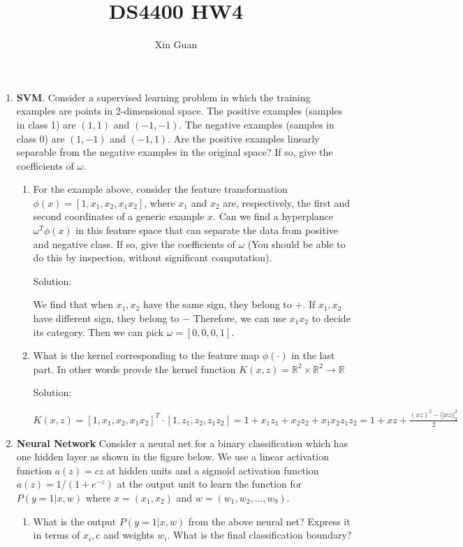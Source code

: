 \documentclass[12pt]{article}
\title{DS4400 HW4}
\author{Xin Guan}
\date{}
\newcommand{\solu}{{\color{blue} Solution:}}
\begin{document}
    \maketitle
    \begin{enumerate}
        \item \textbf{SVM}. Consider a supervised learning problem in which the training examples are points in 2-dimensional space. The positive examples (samples in class 1) are $(1, 1)$ and $(-1, -1)$. The negative examples (samples in class 0) are $(1, -1)$ and $(-1, 1)$. Are the positive examples linearly separable from the negative examples in the original space? If so, give the coefficients of $\omega$.
        \begin{enumerate}
            \item For the example above, consider the feature transformation $\phi(x) = [1, x_1, x_2, x_1x_2]$, where $x_1$ and $x_2$ are, respectively, the first and second coordinates of a generic example $x$. Can we find a hyperplance $\omega^T\phi(x)$ in this feature space that can separate the data from positive and negative class. If so, give the coefficients of $\omega$ (You should be able to do this by inspection, without significant computation).
            
            \solu 

            We find that when $x_1, x_2$ have the same sign, they belong to +. If $x_1, x_2$ have different sign, they belong to $-$ Therefore, we can use $x_1x_2$ to decide its category. Then we can pick $\omega = [0,0,0,1]$.

            \item What is the kernel corresponding to the feature map $\phi(\cdot)$ in the last part. In other words provde the kernel function $K(x,z) = \mathbb{R}^2 \times \mathbb{R}^2 \rightarrow \mathbb{R}$
            
            \solu 

            $K(x,z) = [1,x_1, x_2, x_1x_2]^T\cdot[1,z_1,z_2,z_1z_2] = 1 +x_1z_1 + x_2z_2 + x_1x_2z_1z_2 = 1 + xz + \frac{(xz)^2 - ||xz||_2^2}{2}$
            
        \end{enumerate}

        \item \textbf{Neural Network} Consider a neural net for a binary classification which has one hidden layer as shown in the figure below. We use a linear activation function $a(z) = cz$ at hidden units and a sigmoid activation function $a(z) = 1/(1 + e^{-z})$ at the output unit to learn the function for $P(y = 1|x, w)$ where $x = (x_1, x_2)$ and $w = (w_1, w_2, \dots , w_9)$.
        \begin{enumerate}
            \item What is the output $P(y = 1|x, w)$ from the above neural net? Express it in terms of $x_i, $c and weights $w_i$. What is the final classification boundary?
            

\end{enumerate}
\end{enumerate}
\end{document}
